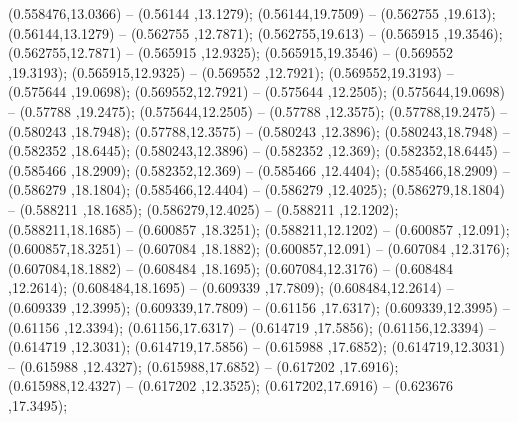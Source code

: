  (0.558476,13.0366) -- (0.56144 ,13.1279);
 (0.56144,19.7509) -- (0.562755 ,19.613);
 (0.56144,13.1279) -- (0.562755 ,12.7871);
 (0.562755,19.613) -- (0.565915 ,19.3546);
 (0.562755,12.7871) -- (0.565915 ,12.9325);
 (0.565915,19.3546) -- (0.569552 ,19.3193);
 (0.565915,12.9325) -- (0.569552 ,12.7921);
 (0.569552,19.3193) -- (0.575644 ,19.0698);
 (0.569552,12.7921) -- (0.575644 ,12.2505);
 (0.575644,19.0698) -- (0.57788 ,19.2475);
 (0.575644,12.2505) -- (0.57788 ,12.3575);
 (0.57788,19.2475) -- (0.580243 ,18.7948);
 (0.57788,12.3575) -- (0.580243 ,12.3896);
 (0.580243,18.7948) -- (0.582352 ,18.6445);
 (0.580243,12.3896) -- (0.582352 ,12.369);
 (0.582352,18.6445) -- (0.585466 ,18.2909);
 (0.582352,12.369) -- (0.585466 ,12.4404);
 (0.585466,18.2909) -- (0.586279 ,18.1804);
 (0.585466,12.4404) -- (0.586279 ,12.4025);
 (0.586279,18.1804) -- (0.588211 ,18.1685);
 (0.586279,12.4025) -- (0.588211 ,12.1202);
 (0.588211,18.1685) -- (0.600857 ,18.3251);
 (0.588211,12.1202) -- (0.600857 ,12.091);
 (0.600857,18.3251) -- (0.607084 ,18.1882);
 (0.600857,12.091) -- (0.607084 ,12.3176);
 (0.607084,18.1882) -- (0.608484 ,18.1695);
 (0.607084,12.3176) -- (0.608484 ,12.2614);
 (0.608484,18.1695) -- (0.609339 ,17.7809);
 (0.608484,12.2614) -- (0.609339 ,12.3995);
 (0.609339,17.7809) -- (0.61156 ,17.6317);
 (0.609339,12.3995) -- (0.61156 ,12.3394);
 (0.61156,17.6317) -- (0.614719 ,17.5856);
 (0.61156,12.3394) -- (0.614719 ,12.3031);
 (0.614719,17.5856) -- (0.615988 ,17.6852);
 (0.614719,12.3031) -- (0.615988 ,12.4327);
 (0.615988,17.6852) -- (0.617202 ,17.6916);
 (0.615988,12.4327) -- (0.617202 ,12.3525);
 (0.617202,17.6916) -- (0.623676 ,17.3495);
